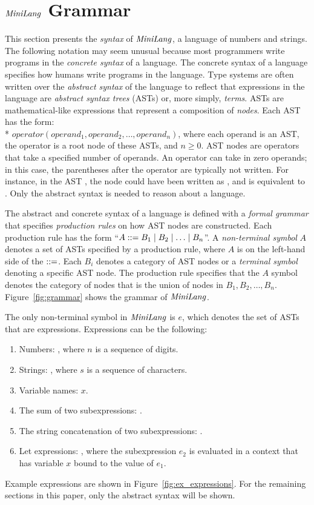\section{\texorpdfstring{$\mathit{MiniLang}$}{MiniLang} Grammar}
\label{sec:grammar}
This section presents the \emph{syntax} of $\mathit{MiniLang}$,
a language of numbers and strings.
The following notation may seem unusual
because most programmers write programs in the
\emph{concrete syntax} of a language.
The concrete syntax of a language specifies how
humans write programs in the language.
Type systems are often written over the
\emph{abstract syntax} of the language to
reflect that expressions in the language are
\emph{abstract syntax trees} (ASTs)
or, more simply, \emph{terms}.
ASTs are mathematical-like expressions
that represent a composition of \emph{nodes}.
Each AST has the form: \\*
$operator(operand_1, operand_2, \ldots, operand_n)$,
where each operand is an AST, the operator
is a root node of these ASTs, and $n \geq 0$.
AST nodes are operators that take a specified
number of operands.
An operator can take in zero operands; in this case,
the parentheses after the operator are typically not written.
For instance, in the AST ,
the node  could have been written as
,
and  is equivalent to .
Only the abstract syntax is needed to reason about
a language.

The abstract and concrete syntax of a language is defined with a
\emph{formal grammar} that specifies \emph{production rules} on how AST
nodes are constructed.
Each production rule has the form
``\mbox{$A \mathrel{::=} B_1 \mathrel{\mid} B_2 \mathrel{\mid} \ldots \mathrel{\mid} B_n$}''.
A \emph{non-terminal symbol} $A$ denotes a set of ASTs specified
by a production rule, where $A$ is on the left-hand side
of the $\mathrel{::=}$.
Each $B_i$ denotes a category of AST nodes
or a \emph{terminal symbol} denoting a specific AST node.
The production rule specifies that the $A$ symbol denotes
the category of nodes that is the union of nodes
in $B_1, B_2, \ldots, B_n$.
Figure~\ref{fig:grammar} shows the grammar of $\mathit{MiniLang}$.



The only non-terminal symbol in $\mathit{MiniLang}$ is $e$,
which denotes the set of ASTs that are expressions.
Expressions can be the following:
\begin{enumerate}
\item Numbers: ,
where $n$ is a sequence of digits.
\item Strings: ,
where $s$ is a sequence of characters.
\item Variable names: $x$.
\item The sum of two subexpressions: .
\item The string concatenation of two subexpressions:
.
\item Let expressions: ,
where the subexpression
$e_2$ is evaluated in a context that has variable
$x$ bound to the value of $e_1$.
\end{enumerate}

Example expressions are shown in Figure~\ref{fig:ex_expressions}.
For the remaining sections in this paper, only the abstract
syntax will be shown.



